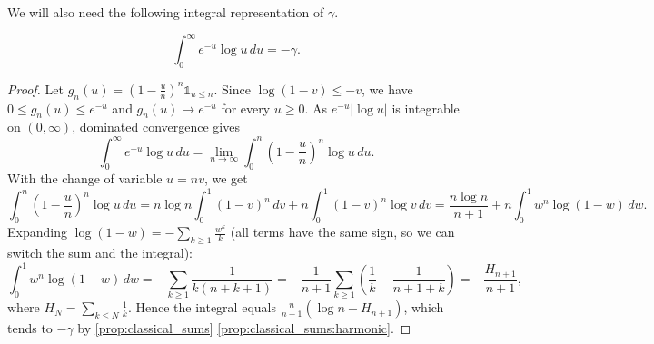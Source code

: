 We will also need the following integral representation of $\gamma$.
\begin{lemma}\label{lem:gamma_integral}
    \begin{equation*}
        \int_0^\infty e^{-u}\log u\,du = -\gamma.
    \end{equation*}
\end{lemma}
\begin{proof}
    Let $g_n(u) = \left(1-\frac un\right)^n\mathds{1}_{u\le n}$. Since $\log(1-v)\le -v$, we have $0\le g_n(u)\le e^{-u}$ and $g_n(u)\to e^{-u}$ for every $u \ge 0$. As $e^{-u}\lvert\log u\rvert$ is integrable on $(0,\infty)$, dominated convergence gives
    \begin{equation*}
        \int_0^\infty e^{-u}\log u\,du = \lim_{n\to\infty}\int_0^n \left(1-\frac un\right)^n\log u\,du.
    \end{equation*}
    With the change of variable $u = nv$, we get
    \begin{equation*}
        \int_0^n \left(1-\frac un\right)^n\log u\,du = n\log n\int_0^1(1-v)^n\,dv + n\int_0^1(1-v)^n\log v\,dv = \frac{n\log n}{n+1} + n\int_0^1 w^n\log(1-w)\,dw.
    \end{equation*}
    Expanding $\log(1-w) = -\sum_{k\ge1}\frac{w^k}{k}$ (all terms have the same sign, so we can switch the sum and the integral):
    \begin{equation*}
        \int_0^1 w^n\log(1-w)\,dw = -\sum_{k\ge 1}\frac{1}{k(n+k+1)} = -\frac{1}{n+1}\sum_{k\ge1}\left(\frac 1k-\frac{1}{n+1+k}\right) = -\frac{H_{n+1}}{n+1},
    \end{equation*}
    where $H_N = \sum_{k\le N}\frac1k$. Hence the integral equals $\frac{n}{n+1}\left(\log n - H_{n+1}\right)$, which tends to $-\gamma$ by \cref{prop:classical_sums} \ref{prop:classical_sums:harmonic}.
\end{proof}
